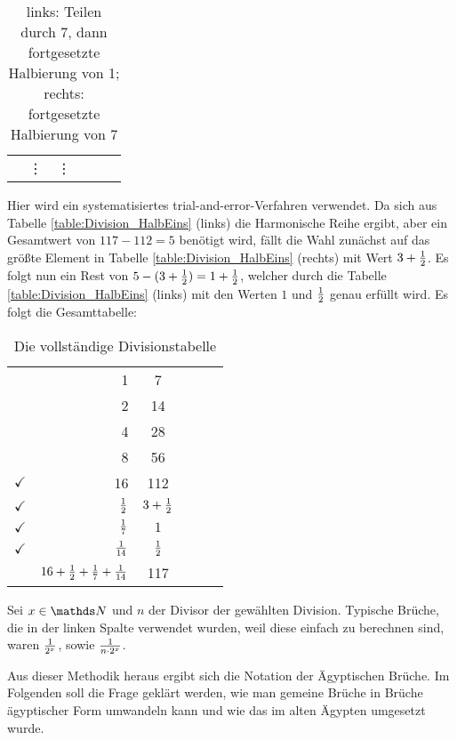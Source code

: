 \begin{bsp}
\begin{table}[H]
\begin{tabular}[h]{Sr Sr Sr}
				&\vdots&\vdots
			\end{tabular}
			\caption{links: Teilen durch 7, dann fortgesetzte Halbierung von 1; rechts: fortgesetzte Halbierung von 7}
			\label{table:Division_HalbEins}
		\end{table}
		Hier wird ein systematisiertes trial-and-error-Verfahren verwendet. Da sich aus Tabelle \autoref{table:Division_HalbEins} (links) die Harmonische Reihe ergibt, aber ein Gesamtwert von $117-112 = 5$ benötigt wird, fällt die Wahl zunächst auf das größte Element in Tabelle \autoref{table:Division_HalbEins} (rechts) mit Wert $3+\frac{1}{2}$. Es folgt nun ein Rest von $5-(3+\frac{1}{2})=1 +\frac{1}{2}$, welcher durch die Tabelle \autoref{table:Division_HalbEins} (links) mit den Werten $1$ und $\frac{1}{2}$ genau erfüllt wird. Es folgt die Gesamttabelle:
		\begin{table}[H]
			\centering
			\begin{tabular}{Sr Sr Sr}
				& 1 & \textcolor{OliveGreen}{7}\\
				& 2 & 14\\
				& 4 & 28\\
				& 8 & 56\\
				$\checkmark$ & 16 & 112\\ 
				$\checkmark$ & $\frac{1}{2}$ & $3+\frac{1}{2}$\\
				$\checkmark$ & $\frac{1}{7}$ & $1$\\
				$\checkmark$ & $\frac{1}{14}$ & $\frac{1}{2}$\\ \hline
				& $16+\frac{1}{2}+\frac{1}{7}+\frac{1}{14}$ & 117
			\end{tabular}
		\caption{Die vollständige Divisionstabelle}
		\label{table:Division_mitRest_full}
		\end{table}
	\end{bsp}
	Sei $x \in \N$ und $n$ der Divisor der gewählten Division. Typische Brüche, die in der linken Spalte verwendet wurden, weil diese einfach zu berechnen sind, waren $\frac{1}{2^x}$,  sowie $\frac{1}{n \cdot 2^x}$.
	
	Aus dieser Methodik heraus ergibt sich die Notation der Ägyptischen Brüche. Im Folgenden soll die Frage geklärt werden, wie man gemeine Brüche in Brüche ägyptischer Form umwandeln kann und wie das im alten Ägypten umgesetzt wurde.
	
